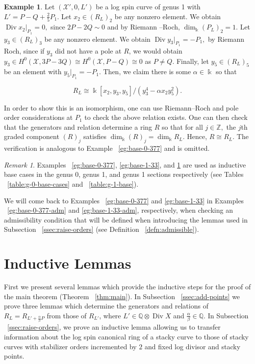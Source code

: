 \documentclass{amsart}
\theoremstyle{plain}
\theoremstyle{definition}
\newtheorem{example}[thm]{Example}
\theoremstyle{remark}
\newtheorem{rem}[thm]{Remark}
\numberwithin{equation}{section}
\newcommand\BQ{{\mathbb Q}}
\newcommand\BZ{{\mathbb Z}}
\newcommand\Bk{{\Bbbk}}
\DeclareMathOperator\di{Div}
\newcommand\sx{\mathscr X}
\newcommand{\halfcan}{L}
\begin{document}
\begin{example}
\label{eg:exception-1-5}
Let $(\sx', 0, L')$ be a log spin curve of genus 1 with $L' = P -
 Q + \frac{2}{5} P_1.$ Let $x_2 \in (R_\halfcan)_2$ be any nonzero element.
We obtain $\di x_2|_{P_1} = 0,$ since $2P - 2Q \sim 0$ and by Riemann
--Roch, $\dim_\Bk (P_L)_2 = 1.$ Let $y_3 \in (R_\halfcan)_3$ be any nonzero
element. We obtain $\di y_3|_{P_1} = - P_1,$ by Riemann Roch, since
if $y_3$ did not have a pole at $R$, we would obtain $y_3 \in H^0
(\sx,3P-3Q) \cong H^0(\sx, P - Q) \cong 0$ as $P \neq Q$. Finally,
let $y_5 \in (R_\halfcan)_5$ be an element with $y_5|_{P_1} = -P_1$. Then,
we claim there is some $\alpha \in \Bk$ so that

$$R_\halfcan \cong \Bk[x_2 , y_3, y_5]/(y_3^4 - \alpha x_2 y_5^2).$$

In order to show this is an isomorphism, one can use Riemann--Roch and pole order considerations at $P_1$ to check the above relation exists. One can then check that the generators and relation determine a ring $R$ so that for all $j \in \BZ,$ the $j$th graded component $(R)_j$ satisfies $\dim_\Bk (R)_j = \dim_\Bk R_\halfcan.$ Hence, $R \cong R_\halfcan$. The verification is analogous to Example ~\ref{eg:base-0-377} and is omitted.
\end{example}

\begin{rem}
\label{rem:base-0-377}
Examples ~\ref{eg:base-0-377}, \ref{eg:base-1-33}, and
\ref{eg:exception-1-5} are used as inductive base cases in the
genus 0, genus 1, and genus 1 sections respectively (see Tables
~\ref{table:g-0-base-cases} and ~\ref{table:g-1-base}).

We will come back to Examples ~\ref{eg:base-0-377} and
\ref{eg:base-1-33} in Examples ~\ref{eg:base-0-377-adm} and
\ref{eg:base-1-33-adm}, respectively, when checking an
admissibility condition that will be defined when introducing the
lemmas used in Subsection ~\ref{ssec:raise-orders} (see Definition
~\ref{defn:admissible}).
\end{rem}



\section{Inductive Lemmas}
\label{sec:induction}
First we present several lemmas which provide the inductive steps
for the proof of the main theorem (Theorem ~\ref{thm:main}). In
Subsection ~\ref{ssec:add-points} we prove three lemmas which
determine the generators and relations of $R_\halfcan = R_{\halfcan'
+ \frac{\alpha }{\beta}P}$ from those of $R_{\halfcan'}$, where
$\halfcan' \in \BQ \otimes \di X$ and $\frac{\alpha}{\beta} \in \BQ$. 
In Subsection ~\ref{ssec:raise-orders}, we prove an inductive lemma
allowing us to transfer information about the log spin canonical 
ring of a stacky curve to those of stacky curves with stabilizer
orders incremented by $2$ and fixed log divisor and stacky points.
\end{document}

